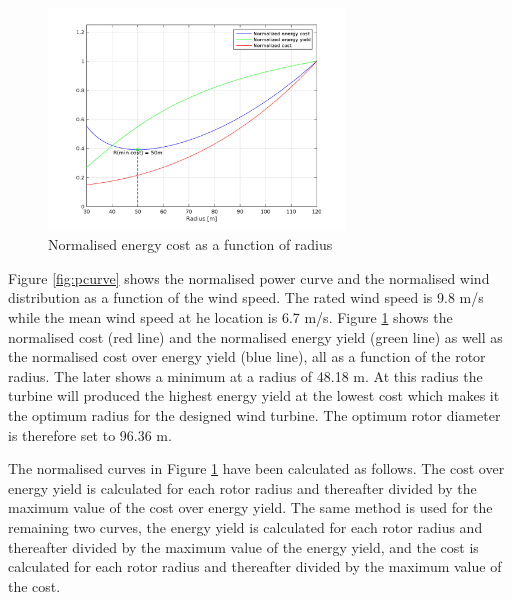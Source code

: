 \begin{figure}[H]
\centering
\includegraphics[width=0.7\textwidth]{Images/optimal_cost.png} 
\caption{Normalised energy cost as a function of radius}\label{fig:costey}
\end{figure}

Figure \ref{fig:pcurve} shows the normalised power curve and the normalised wind distribution as a function of the wind speed. The rated wind speed is 9.8 m/s while the mean wind speed at he location is 6.7 m/s. Figure \ref{fig:costey} shows the normalised cost (red line) and the normalised energy yield (green line) as well as the normalised cost over energy yield (blue line), all as a function of the rotor radius. The later shows a minimum at a radius of 48.18 m. At this radius the turbine will produced the highest energy yield at the lowest cost which makes it the optimum radius for the designed wind turbine. The optimum rotor diameter is therefore set to 96.36 m.

The normalised curves in Figure \ref{fig:costey} have been calculated as follows. The cost over energy yield is calculated for each rotor radius and thereafter divided by the maximum value of the cost over energy yield. The same method is used for the remaining two curves, the energy yield is calculated for each rotor radius and thereafter divided by the maximum value of the energy yield, and the cost is calculated for each rotor radius and thereafter divided by the maximum value of the cost.